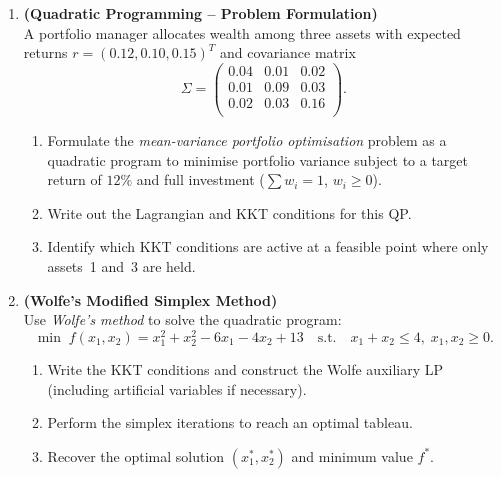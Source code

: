 \documentclass[12pt,a4paper]{article}
\begin{document}
\begin{enumerate}[leftmargin=*, label=\textbf{Q.\arabic*.}]
\item \textbf{(Quadratic Programming -- Problem Formulation)}\\
  A portfolio manager allocates wealth among three assets with expected returns
  $r = (0.12, 0.10, 0.15)^T$ and covariance matrix
  \[
    \Sigma = \begin{pmatrix}
               0.04 & 0.01 & 0.02 \\
               0.01 & 0.09 & 0.03 \\
               0.02 & 0.03 & 0.16 \\
             \end{pmatrix}.
  \]
  \begin{enumerate}[label=(\alph*)]
    \item Formulate the \textit{mean-variance portfolio optimisation} problem
          as a quadratic program to minimise portfolio variance subject to a
          target return of $12\%$ and full investment ($\sum w_i = 1$,
          $w_i \ge 0$).
    \item Write out the Lagrangian and KKT conditions for this QP.
    \item Identify which KKT conditions are active at a feasible point where
          only assets~1 and~3 are held.
  \end{enumerate}

\item \textbf{(Wolfe's Modified Simplex Method)}\\
  Use \textit{Wolfe's method} to solve the quadratic program:
  \[
    \min\; f(x_1, x_2) = x_1^2 + x_2^2 - 6x_1 - 4x_2 + 13
    \quad\text{s.t.}\quad x_1 + x_2 \le 4,\; x_1, x_2 \ge 0.
  \]
  \begin{enumerate}[label=(\alph*)]
    \item Write the KKT conditions and construct the Wolfe auxiliary LP
          (including artificial variables if necessary).
    \item Perform the simplex iterations to reach an optimal tableau.
    \item Recover the optimal solution $(x_1^*, x_2^*)$ and minimum value
          $f^*$.
  \end{enumerate}


\end{enumerate}
\end{document}
